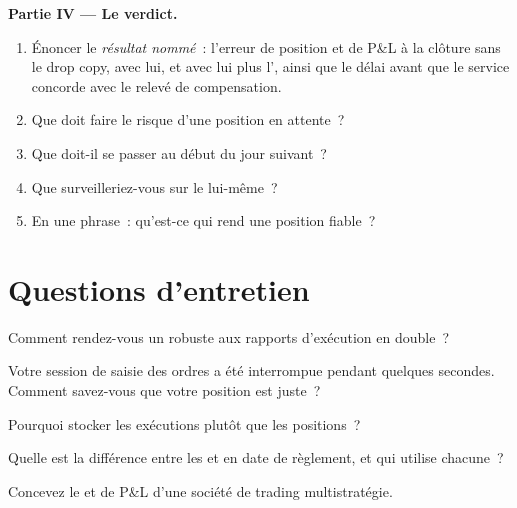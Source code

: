 \begin{problem}
\medskip\noindent\textbf{Partie IV --- Le verdict.}
\begin{enumerate}[resume]
\item Énoncer le \emph{résultat nommé}~: l'erreur de position et de P\&L à la clôture sans le drop copy, avec lui, et avec lui plus l',
ainsi que le délai avant que le service concorde avec le relevé de compensation.
\item Que doit faire le risque d'une position en attente~?
\item Que doit-il se passer au début du jour suivant~?
\item Que surveilleriez-vous sur le  lui-même~?
\item En une phrase~: qu'est-ce qui rend une position fiable~?
\end{enumerate}
\end{problem}

\section{Questions d'entretien}

\begin{interviewq}\label{iq:pl:position-and-pnl-services:1}
Comment rendez-vous un  robuste aux rapports d'exécution en double~?
\end{interviewq}

\begin{interviewq}\label{iq:pl:position-and-pnl-services:2}
Votre session de saisie des ordres a été interrompue pendant quelques secondes. Comment savez-vous que votre position est juste~?
\end{interviewq}

\begin{interviewq}\label{iq:pl:position-and-pnl-services:3}
Pourquoi stocker les exécutions plutôt que les positions~?
\end{interviewq}

\begin{interviewq}\label{iq:pl:position-and-pnl-services:4}
Quelle est la différence entre les  et en date de règlement, et qui utilise chacune~?
\end{interviewq}

\begin{interviewq}\label{iq:pl:position-and-pnl-services:5}
Concevez le  et de P\&L d'une société de trading multistratégie.
\end{interviewq}
